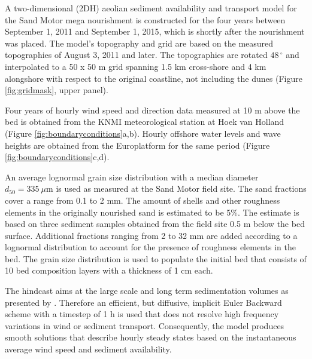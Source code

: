 A two-dimensional (2DH) aeolian sediment availability and transport
model for the Sand Motor mega nourishment is constructed for the four
years between September 1, 2011 and September 1, 2015, which is
shortly after the nourishment was placed. The model's topography and
grid are based on the measured topographies of August 3, 2011 and
later. The topographies are rotated $48\,^{\circ}$ and interpolated to
a 50 x 50 m grid spanning 1.5 km cross-shore and 4 km alongshore with
respect to the original coastline, not including the dunes (Figure
\ref{fig:gridmask}, upper panel).

Four years of hourly wind speed and direction data measured at 10 m
above the bed is obtained from the KNMI meteorological station at Hoek
van Holland (Figure \ref{fig:boundaryconditions}a,b). Hourly offshore
water levels and wave heights are obtained from the Europlatform for
the same period (Figure \ref{fig:boundaryconditions}c,d).

An average lognormal grain size distribution with a median diameter
$d_{50} = 335 ~ \mu \mathrm{m}$ is used as measured at the Sand Motor
field site. The sand fractions cover a range from 0.1 to 2 mm. The
amount of shells and other roughness elements in the originally
nourished sand is estimated to be 5\%. The estimate is based on three
sediment samples obtained from the field site 0.5 m below the bed
surface. Additional fractions ranging from 2 to 32 mm are added
according to a lognormal distribution to account for the presence of
roughness elements in the bed. The grain size distribution is used to
populate the initial bed that consists of 10 bed composition layers
with a thickness of 1 cm each.

The hindcast aims at the large scale and long term sedimentation
volumes as presented by \citet{Hoonhout2017a}. Therefore an efficient,
but diffusive, implicit Euler Backward scheme with a timestep of 1 h
is used that does not resolve high frequency variations in wind or
sediment transport. Consequently, the model produces smooth solutions
that describe hourly steady states based on the instantaneous average
wind speed and sediment availability.


